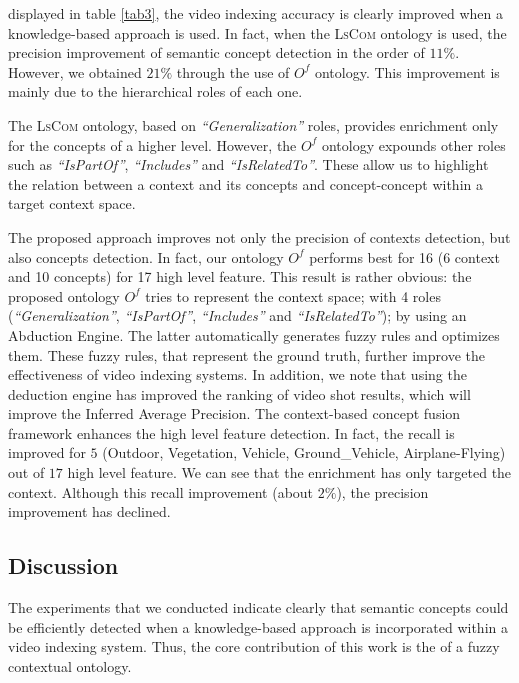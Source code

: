 	 displayed in table  \ref{tab3}, the video indexing accuracy is clearly improved when a knowledge-based approach is used. In fact, when the \textsc{LsCom} ontology is used, the precision improvement of semantic concept detection in the order of $11\%$. However, we obtained $21\%$ through the use of $O^{f}$ ontology. This improvement is mainly due to the hierarchical roles of each one. 


	The \textsc{LsCom}  ontology, based on \textit{“Generalization”} roles,
 provides enrichment only for the concepts of a higher
 level. However, the $O^{f}$ ontology expounds other roles
 such as \textit{“IsPartOf”}, \textit{“Includes”} and \textit{“IsRelatedTo”}.
 These allow us to highlight the relation between a
 context and its concepts and concept-concept within a
 target context space.


	The proposed approach improves not only the precision
 of contexts detection, but also concepts detection. In
 fact, our ontology $O^{f}$ performs best for 16 (6 context
 and 10 concepts) for 17 high level feature. This result is
 rather obvious: the proposed ontology $O^{f}$  tries to
 represent the context space; with 4 roles
 (\textit{“Generalization”},
 \textit{“IsPartOf”},
 \textit{“Includes”}
 and
 \textit{“IsRelatedTo”}); by using an Abduction Engine. The
 latter automatically generates fuzzy rules and optimizes
 them. These fuzzy rules, that represent the ground truth,
 further improve the effectiveness of video indexing
systems. In addition, we note that using the deduction
 engine has improved the ranking of video shot results,
 which will improve the Inferred Average Precision.
 The context-based concept fusion framework enhances
 the high level feature detection. In fact, the recall is
 improved for $5$ (Outdoor, Vegetation, Vehicle,
 Ground\_Vehicle, Airplane-Flying) out of $17$ high level
 feature. We can see that the enrichment has only
 targeted the context. Although this recall improvement (about $2\%$), the precision improvement has declined.
 
	\subsection{Discussion}
	The experiments that we conducted indicate clearly that semantic concepts could be efficiently 
	detected when a knowledge-based approach is incorporated within a video indexing system. Thus, 
	the core contribution of this work is the  of a fuzzy contextual ontology. 
	
